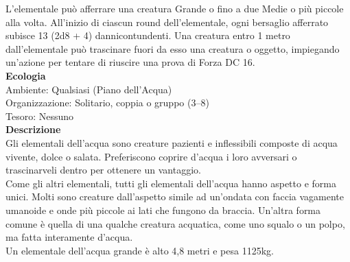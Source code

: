 \begin{multicols}{2}
L'elementale può afferrare una creatura Grande o fino a due Medie o più piccole alla volta. All'inizio di ciascun round dell'elementale, ogni bersaglio afferrato subisce 13 (2d8 + 4) dannicontundenti. Una creatura entro 1 metro dall'elementale può trascinare fuori da esso una  creatura o oggetto, impiegando un'azione per tentare di riuscire una prova di Forza DC  16.\\
\textbf{Ecologia}\\
Ambiente: Qualsiasi (Piano dell'Acqua)\\
Organizzazione: Solitario, coppia o gruppo (3–8)\\
Tesoro: Nessuno\\
\textbf{Descrizione}\\
Gli elementali dell'acqua sono creature pazienti e inflessibili composte di acqua vivente, dolce o salata. Preferiscono coprire d’acqua i loro avversari o trascinarveli dentro per ottenere un vantaggio.\\
Come gli altri elementali, tutti gli elementali dell'acqua hanno aspetto e forma unici. Molti sono creature dall'aspetto simile ad un'ondata con faccia vagamente umanoide e onde più piccole ai lati che fungono da braccia. Un'altra forma comune è quella di una qualche creatura acquatica, come uno squalo o un polpo, ma fatta interamente d'acqua.\\
Un elementale dell'acqua grande è alto 4,8 metri e pesa 1125kg.\\


\end{multicols}
